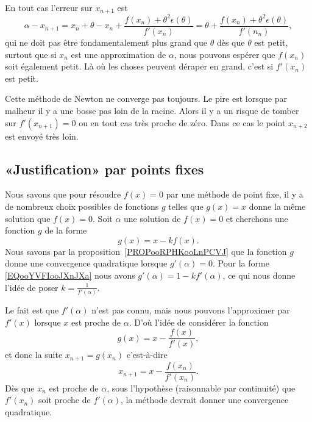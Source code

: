 En tout cas l'erreur sur \( x_{n+1}\) est
\begin{equation}
	\alpha-x_{n+1}=x_n+\theta-x_n+\frac{ f(x_n)+\theta^2\epsilon(\theta) }{ f'(x_n) }=\theta+\frac{ f(x_n)+\theta^2\epsilon(\theta) }{ f'(n_n) },
\end{equation}
qui ne doit pas être fondamentalement plus grand que \( \theta\) dès que \( \theta\) est petit, surtout que si \( x_n\) est une approximation de \( \alpha\), nous pouvons espérer que \( f(x_n)\) soit également petit. Là où les choses peuvent déraper en grand, c'est si \( f'(x_n)\) est petit.

Cette méthode de Newton ne converge pas toujours. Le pire est lorsque par malheur il y a une bosse pas loin de la racine. Alors il y a un risque de tomber sur \( f'(x_{n+1})=0\) ou en tout cas très proche de zéro. Dans ce cas le point \( x_{n+2}\) est envoyé très loin.

\subsection{«Justification» par points fixes}
\label{SUBSECooIBLNooTujslO}

Nous savons que pour résoudre \( f(x)=0\) par une méthode de point fixe, il y a de nombreux choix possibles de fonctions \( g\) telles que \( g(x)=x\) donne la même solution que \( f(x)=0\). Soit \( \alpha\) une solution de \( f(x)=0\) et cherchons une fonction \( g\) de la forme
\begin{equation}        \label{EQooYVFIooJXnJXa}
	g(x)=x-kf(x).
\end{equation}
Nous savons par la proposition~\ref{PROPooRPHKooLnPCVJ} que la fonction \( g\) donne une convergence quadratique lorsque \( g'(\alpha)=0\). Pour la forme \eqref{EQooYVFIooJXnJXa} nous avons \( g'(\alpha)=1-kf'(\alpha)\), ce qui nous donne l'idée de poser \( k=\frac{1}{ f'(\alpha) }\).

Le fait est que \( f'(\alpha)\) n'est pas connu, mais nous pouvons l'approximer par \( f'(x)\) lorsque \( x\) est proche de \( \alpha\). D'où l'idée de considérer la fonction
\begin{equation}
	g(x)=x-\frac{ f(x) }{ f'(x) },
\end{equation}
et donc la suite \( x_{n+1}=g(x_n)\) c'est-à-dire
\begin{equation}
	x_{n+1}=x-\frac{ f(x_n) }{ f'(x_n) }.
\end{equation}
Dès que \( x_n\) est proche de \( \alpha\), sous l'hypothèse (raisonnable par continuité) que \( f'(x_n)\) soit proche de \( f'(\alpha)\), la méthode devrait donner une convergence quadratique.


